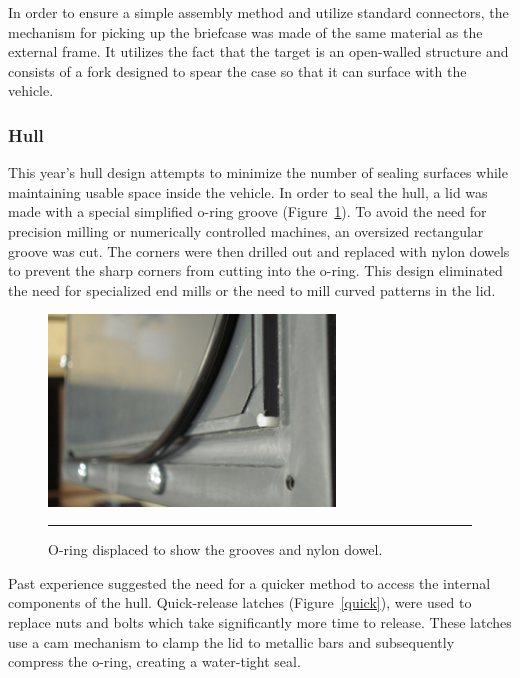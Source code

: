 In order to ensure a simple assembly method and utilize standard
connectors, the mechanism for picking up the briefcase was made of the
same material as the external frame.  It utilizes the fact that the
target is an open-walled structure and consists of a fork designed to
spear the case so that it can surface with the vehicle.

\subsubsection{Hull}
This year's hull design attempts to minimize the number of sealing
surfaces while maintaining usable space inside the vehicle.  In order
to seal the hull, a lid was made with a special simplified o-ring
groove (Figure~\ref{oring}). To avoid the need for precision milling or numerically
controlled machines, an oversized rectangular groove was cut.  The
corners were then drilled out and replaced with nylon dowels to
prevent the sharp corners from cutting into the o-ring.  This design
eliminated the need for specialized end mills or the need to mill
curved patterns in the lid. 

\begin{figure}
\begin{center}
 \includegraphics[width=3in]{fig/dsc06460} 
\vspace{.05in}
\hrule
\caption{O-ring displaced to show the grooves and nylon dowel.}\label{oring}
\end{center}
\end{figure}

Past experience suggested the need for a quicker method to access the
internal components of the hull.  Quick-release latches 
(Figure~\ref{quick}), were
used to replace nuts and bolts which take significantly more time to
release.  These latches use a cam mechanism to clamp the lid to
metallic bars and subsequently compress the o-ring, creating a water-tight seal.

